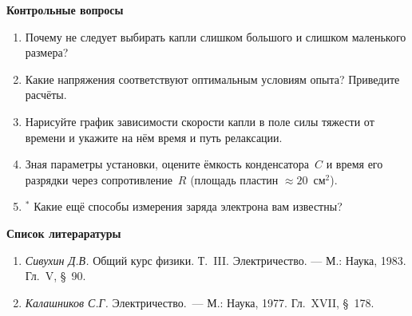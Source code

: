 
{\small

{\bf \Large Контрольные вопросы}
\begin{enumerate}

\item{ Почему не следует выбирать капли слишком большого и слишком маленького размера?}

\item{ Какие напряжения соответствуют оптимальным условиям опыта? Приведите расчёты.}

\item{ Нарисуйте график зависимости скорости капли в поле силы тяжести от времени и укажите на нём время и путь релаксации.}

\item{ Зная параметры установки, оцените ёмкость конденсатора~$C$ и время его разрядки через сопротивление~$R$ (площадь пластин ${\approx}20$~см$^2$).}

\item{$^*$ Какие ещё способы измерения заряда электрона вам известны?}
\end{enumerate}

{\bf \Large Список литераратуры}

\begin{enumerate}

\item{ {\em Сивухин Д.В.} Общий курс физики. Т.~III. Электричество. --- М.: Наука, 1983. Гл.~V, \S~90.}

\item{ {\em Калашников С.Г.} Электричество.~--- М.: Наука, 1977. Гл.~XVII, \S~178.}
\end{enumerate}
}